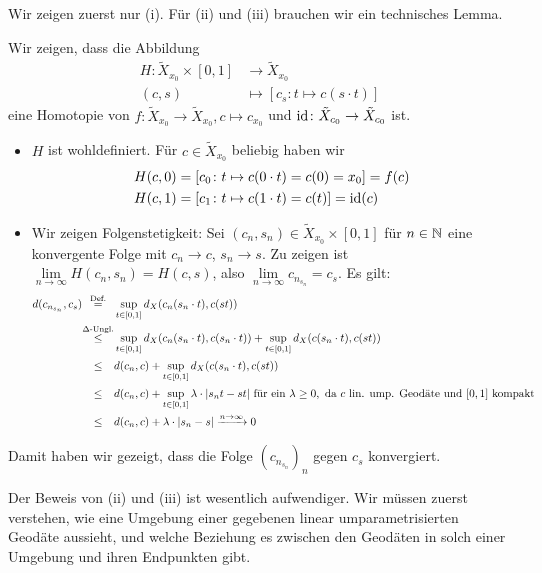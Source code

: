 \begin{beweis}
	Wir zeigen zuerst nur (i).
	Für (ii) und (iii) brauchen wir ein technisches Lemma.
	
	Wir zeigen, dass die Abbildung
	\begin{align*}
		H\colon \tilde{X}_{x_0} \times [0,1] &\longrightarrow \tilde{X}_{x_0} \\
		(c,s) &\longmapsto [c_s \colon t \mapsto c(s \cdot t)]
	\end{align*}
	eine Homotopie von $f\colon \tilde{X}_{x_0} \rightarrow \tilde{X}_{x_0}, c \mapsto c_{x_0}$ und $\operatorname{id}\colon \tilde{X}_{c_0} \rightarrow \tilde{X}_{c_0}$ ist.
	\begin{itemize}
		\item $H$ ist wohldefiniert.
		Für $c \in \tilde{X}_{x_0}$ beliebig haben wir
		\begin{align*}
			H(c,0) &= [c_0 \colon t \mapsto c(0 \cdot t) = c(0) = x_0] = f(c) \\
			H(c,1) &= [c_1 \colon t \mapsto c(1 \cdot t) = c(t)] = \operatorname{id}(c)
		\end{align*}
		\item Wir zeigen Folgenstetigkeit:
		Sei $(c_n,s_n) \in \tilde{X}_{x_0} \times [0,1]$ für $n \in \mathbb{N}$ eine konvergente Folge mit $c_n \rightarrow c$, $s_n \rightarrow s$.
		Zu zeigen ist $\lim\limits_{n \rightarrow \infty} H(c_n,s_n) = H(c,s)$, also $\lim\limits_{n \rightarrow \infty} c_{n_{s_n}} = c_s$.
		Es gilt:
		\begin{align*}
			d(c_{n_{s_n}},c_s) &\stack{\text{Def.}}{=} \sup_{t \in [0,1]} d_X(c_n(s_n \cdot t),c(st)) \\
			&\stack{\Delta\text{-Ungl.}}{\leq} \sup_{t \in [0,1]} d_X(c_n(s_n \cdot t),c(s_n \cdot t)) + \sup_{t \in [0,1]} d_X(c(s_n \cdot t),c(st)) \\
			&\stack{}{\leq} d(c_n,c) + \sup_{t \in [0,1]} d_X(c(s_n \cdot t), c(st)) \\
			&\stack{}{\leq} d(c_n,c) + \sup_{t \in [0,1]} \lambda \cdot \abs{s_n t - st} \text{ für ein } \lambda \geq 0, \text{ da } c \text{ lin. ump. Geodäte und } [0,1] \text{ kompakt} \\
			&\stack{}{\leq} d(c_n,c) + \lambda \cdot \abs{s_n-s} \xrightarrow{n \rightarrow \infty} 0
		\end{align*}
	\end{itemize}
	Damit haben wir gezeigt, dass die Folge $(c_{n_{s_n}})_n$ gegen $c_s$ konvergiert. \qedhere
\end{beweis}

Der Beweis von (ii) und (iii) ist wesentlich aufwendiger.
Wir müssen zuerst verstehen, wie eine Umgebung einer gegebenen linear umparametrisierten Geodäte aussieht, und welche Beziehung es zwischen den Geodäten in solch einer Umgebung und ihren Endpunkten gibt.

